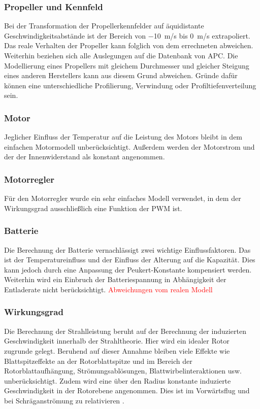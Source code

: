 \subsubsection{Propeller und Kennfeld}
Bei der Transformation der Propellerkennfelder auf äquidistante Geschwindigkeitsabstände ist der Bereich von \SI{-10}{m/s} bis \SI{0}{m/s} extrapoliert. Das reale Verhalten der Propeller kann folglich von dem errechneten abweichen. Weiterhin beziehen sich alle Auslegungen auf die Datenbank von APC. 
Die Modellierung eines Propellers mit gleichem Durchmesser und gleicher Steigung eines anderen Herstellers kann aus diesem Grund abweichen. Gründe dafür können eine unterschiedliche Profilierung, Verwindung oder Profiltiefenverteilung sein. 

\subsubsection{Motor}
Jeglicher Einfluss der Temperatur auf die Leistung des Motors bleibt in dem einfachen Motormodell unberücksichtigt. Außerdem werden der Motorstrom und der der Innenwiderstand als konstant angenommen.

\subsubsection{Motorregler}
Für den Motorregler wurde ein sehr einfaches Modell verwendet, in dem der Wirkungsgrad ausschließlich eine Funktion der PWM ist.

\subsubsection{Batterie}
Die Berechnung der Batterie vernachlässigt zwei wichtige Einflussfaktoren. Das ist der Temperatureinfluss und der Einfluss der Alterung auf die Kapazität. Dies kann jedoch durch eine Anpassung der Peukert-Konstante kompensiert werden. Weiterhin wird ein Einbruch der Batteriespannung in Abhängigkeit der Entladerate nicht berücksichtigt. \textcolor{red}{Abweichungen vom realen Modell}

\subsubsection{Wirkungsgrad}
Die Berechnung der Strahlleistung beruht auf der Berechnung der induzierten Geschwindigkeit innerhalb der Strahltheorie. Hier wird ein idealer Rotor zugrunde gelegt.
Beruhend auf dieser Annahme bleiben viele Effekte wie Blattspitzeffekte an der Rotorblattspitze und im Bereich der Rotorblattaufhängung, Strömungsablösungen, Blattwirbelinteraktionen usw. unberücksichtigt.  Zudem wird eine über den Radius konstante induzierte Geschwindigkeit in der Rotorebene angenommen. Dies ist im Vorwärtsflug und bei Schräganströmung zu relativieren \cite[S.226]{Wall.2015}.

